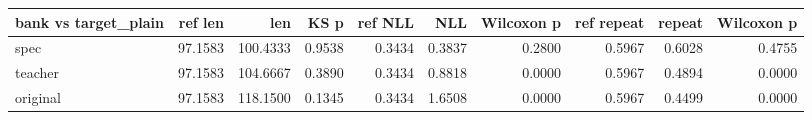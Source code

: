 \begin{tabular}{lrrrrrrrrr}
\toprule
bank vs target\_plain & ref len & len & KS p & ref NLL & NLL & Wilcoxon p & ref repeat & repeat & Wilcoxon p \\
\midrule
spec & 97.1583 & 100.4333 & 0.9538 & 0.3434 & 0.3837 & 0.2800 & 0.5967 & 0.6028 & 0.4755 \\
teacher & 97.1583 & 104.6667 & 0.3890 & 0.3434 & 0.8818 & 0.0000 & 0.5967 & 0.4894 & 0.0000 \\
original & 97.1583 & 118.1500 & 0.1345 & 0.3434 & 1.6508 & 0.0000 & 0.5967 & 0.4499 & 0.0000 \\
\bottomrule
\end{tabular}
